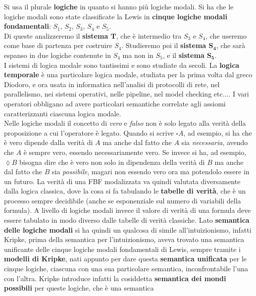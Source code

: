 \documentclass[a4paper,12pt, oneside]{book}
\begin{document}
Si usa il plurale \textbf{logiche} in quanto si hanno più logiche modali. Si
ha che le logiche modali sono state classificate la Lewis in \textbf{cinque
  logiche modali fondamentali}: $S_1$, $S_2$, $S_3$, $S_4$ e $S_5$.\\
Di queste analizzeremo il \textbf{sistema $\mathbf{T}$}, che è intermedio tra
$S_3$ e $S_4$, che useremo come base di partenza per costruire $S_4$. Studieremo
poi il \textbf{sistema $\mathbf{S_4}$}, che sarà espanso in due logiche
contenute in $S_4$ ma non in $S_5$, e il \textbf{sistema $\mathbf{S_5}$}. \\
I sistemi di logica modale sono tantissimi e sono studiate da secoli. La
\textbf{logica temporale} è una particolare logica modale, studiata per la prima
volta dal greco Diodoro, e ora usata in informatica nell'analisi di protocolli
di rete, nel parallelismo, nei sistemi operativi, nelle pipeline, nel model
checking etc$\ldots$. I vari operatori obbligano ad avere particolari semantiche
correlate agli assiomi caratterizzanti ciascuna logica modale.\\
Nelle logiche modali il concetto di \textit{vero} e \textit{falso} non è solo
legato alla verità della proposizione a cui l'operatore è legato. Quando si
scrive $\square A$, ad esempio, si ha che è vero dipende dalla verità di $A$ ma
anche dal fatto che $A$ sia \textit{necessaria}, avendo che $A$ è sempre vero,
essendo necessariamente vero. Se invece si ha, ad esempio,
$\lozenge B$ bisogna dire che è vero non solo in dipendenza della verità di $B$
ma anche dal fatto che $B$ sia \textit{possibile}, magari non essendo vero ora
ma potendolo essere in un futuro. La verità di una FBF modalizzata va quindi
valutata diversamente dalla logica classica, dove la cosa si fa tabulando le
\textbf{tabelle di verità}, che è un processo sempre decidibile (anche se
esponenziale sul numero di variabili della formula). A livello di logiche modali
invece il valore di verità di una formula deve essere tabulato in modo diverso
dalle tabelle di verità classiche. Lato \textbf{semantica delle logiche modali}
si ha quindi un qualcosa di simile all'intuizionismo, infatti Kripke, prima
della semantica per l'intuizionismo, aveva trovato una semantica unificante
delle cinque logiche modali fondamentali di Lewis, sempre tramite i
\textbf{modelli di Kripke}, nati appunto per dare questa \textbf{semantica
  unificata} per le cinque logiche, ciascuna con una sua particolare semantica,
inconfrontabile l'una con l'altra. Kripke introduce infatti la cosiddetta
\textbf{semantica dei mondi possibili} per queste logiche, che è una semantica
\end{document}
